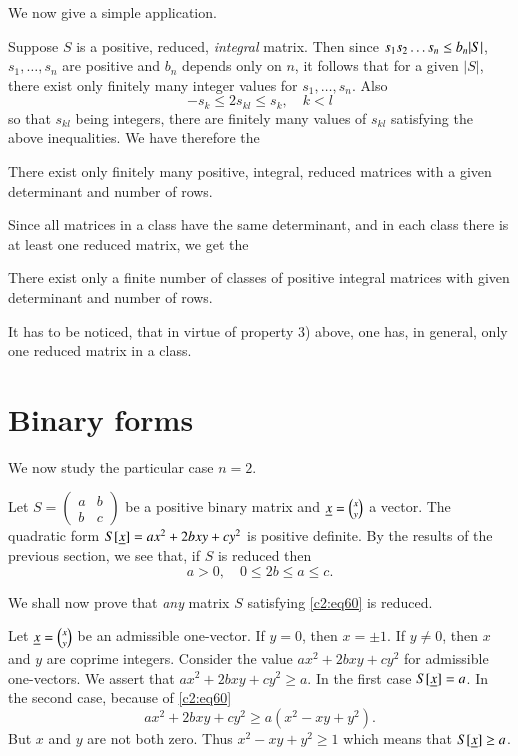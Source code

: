 We now give a simple application.

Suppose $S$ is a positive, reduced, {\em integral} matrix. Then since
$s_{1}s_{2}\ldots\break s_{n}\leq b_{n}|S|$, $s_{1},\ldots,s_{n}$ are
positive and $b_{n}$ depends only on $n$, it follows that for a given
$|S|$, there exist only finitely many integer values for
$s_{1},\ldots,s_{n}$. Also
$$
-s_{k}\leq 2s_{kl}\leq s_{k},\quad k<l
$$
so that $s_{kl}$ being integers, there are finitely many values of
$s_{kl}$ satisfying the above inequalities. We have therefore the

\begin{thm}\label{chap2:thm11}
There exist only finitely many positive, integral, reduced matrices
with a given determinant and number of rows.
\end{thm}


Since all matrices in a class have the same determinant, and in each
class there is at least one reduced matrix, we get the

\begin{thm}\label{chap2:thm12}
There exist only a finite number of classes of positive integral
matrices with given determinant and number of rows.
\end{thm}

It has to be noticed, that in virtue of property 3) above, one has, in
general, only one reduced matrix in a class. 

\section{Binary forms}\label{chap2:sec6}\pageoriginale

We now study the particular case $n=2$.

Let $S=\left(\begin{smallmatrix} a & b\\ b &
  c\end{smallmatrix}\right)$ be a positive binary matrix and
  $\underline{x}=\binom{x}{y}$ a vector. The quadratic form
  $S[\underline{x}]=ax^{2}+2bxy+cy^{2}$ is positive definite. By the results
  of the previous section, we see that, if $S$ is reduced then
\begin{equation*}
a>0,\quad 0\leq 2b\leq a\leq c.\tag{60}\label{c2:eq60}
\end{equation*}

We shall now prove that {\em any} matrix $S$ satisfying \eqref{c2:eq60} is
reduced.

Let $\underline{x}=\binom{x}{y}$ be an admissible one-vector. If $y=0$, then
$x=\pm 1$. If $y\neq 0$, then $x$ and $y$ are coprime
integers. Consider the value $ax^{2}+2bxy+cy^{2}$ for admissible
one-vectors. We assert that $ax^{2}+2bxy+cy^{2}\geq a$. In the first
case $S[\underline{x}]=a$. In the second case, because of \eqref{c2:eq60}
$$
ax^{2}+2bxy+cy^{2}\geq a(x^{2}-xy+y^{2}).
$$
But $x$ and $y$ are not both zero. Thus $x^{2}-xy+y^{2}\geq 1$ which
means that $S[\underline{x}]\geq a$.


